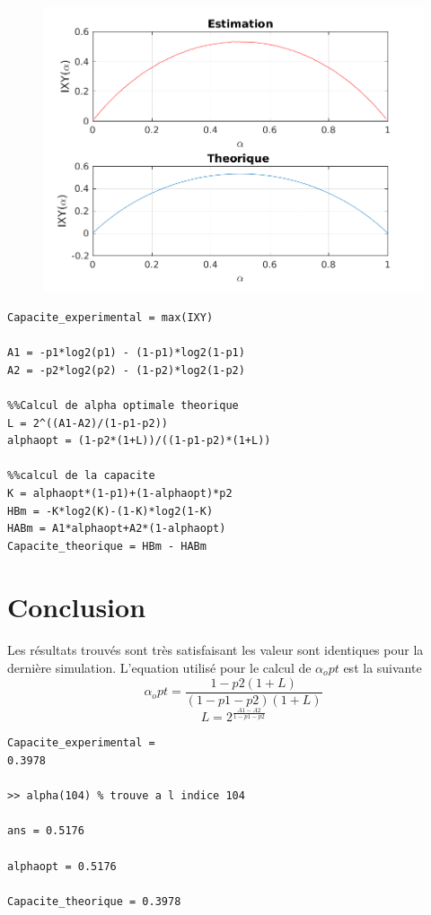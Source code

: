 \documentclass{report}
\begin{document}
\begin{figure}[h]
	\centering
	\captionsetup{justification=centering}
	\includegraphics[width=0.6\linewidth]{../canal3}
	\caption{}
	\label{fig:}
\end{figure}


\begin{lstlisting}[caption={Code calcul de capacite du canal },label=code_]
Capacite_experimental = max(IXY)

A1 = -p1*log2(p1) - (1-p1)*log2(1-p1)
A2 = -p2*log2(p2) - (1-p2)*log2(1-p2)

%%Calcul de alpha optimale theorique
L = 2^((A1-A2)/(1-p1-p2))
alphaopt = (1-p2*(1+L))/((1-p1-p2)*(1+L))

%%calcul de la capacite
K = alphaopt*(1-p1)+(1-alphaopt)*p2
HBm = -K*log2(K)-(1-K)*log2(1-K)
HABm = A1*alphaopt+A2*(1-alphaopt)
Capacite_theorique = HBm - HABm
\end{lstlisting}




\section{Conclusion}

Les résultats trouvés sont très satisfaisant les valeur sont identiques pour la dernière simulation.
L'equation utilisé pour le calcul de $\alpha_opt$ est la suivante
\begin{equation}\label{key}
\alpha_opt = \frac{1-p2(1+L)}{(1-p1-p2)(1+L)}
\end{equation}
\begin{equation}\label{key}
L = 2^{\frac{A1-A2}{1-p1-p2}}
\end{equation}
\begin{lstlisting}[caption={Resultats },label=code_resultqts]
Capacite_experimental =
0.3978

>> alpha(104) % trouve a l indice 104

ans = 0.5176

alphaopt = 0.5176

Capacite_theorique = 0.3978
\end{lstlisting}
\end{document}
